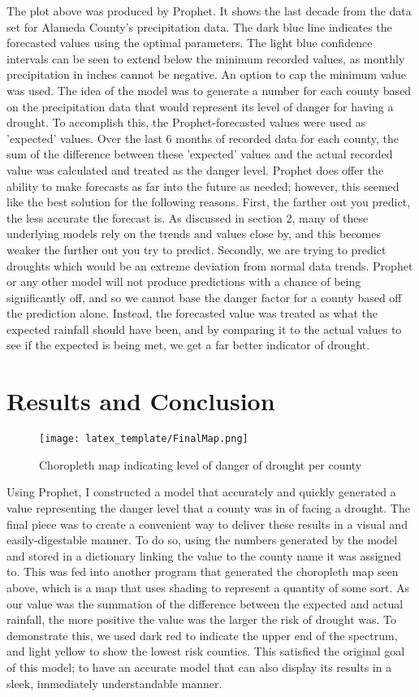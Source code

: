 \documentclass{article}
\begin{document}
The plot above was produced by Prophet. It shows the last decade from the data set for Alameda County's precipitation data. The dark blue line indicates the forecasted values using the optimal parameters. The light blue confidence intervals can be seen to extend below the minimum recorded values, as monthly precipitation in inches cannot be negative. An option to cap the minimum value was used. The idea of the model was to generate a number for each county based on the precipitation data that would represent its level of danger for having a drought. To accomplish this, the Prophet-forecasted values were used as 'expected' values. Over the last 6 months of recorded data for each county, the sum of the difference between these 'expected' values and the actual recorded value was calculated and treated as the danger level. Prophet does offer the ability to make forecasts as far into the future as needed; however, this seemed like the best solution for the following reasons. First, the farther out you predict, the less accurate the forecast is. As discussed in section 2, many of these underlying models rely on the trends and values close by, and this becomes weaker the further out you try to predict. Secondly, we are trying to predict droughts which would be an extreme deviation from normal data trends. Prophet or any other model will not produce predictions with a chance of being significantly off, and so we cannot base the danger factor for a county based off the prediction alone. Instead, the forecasted value was treated as what the expected rainfall should have been, and by comparing it to the actual values to see if the expected is being met, we get a far better indicator of drought. 


\section{Results and Conclusion}


\begin{figure}[htp]
    \centering
    \texttt{[image: latex\_template/FinalMap.png]}
    \caption{Choropleth map indicating level of danger of drought per county}
    \label{fig:galaxy}
\end{figure}


Using Prophet, I constructed a model that accurately and quickly generated a value representing the danger level that a county was in of facing a drought. The final piece was to create a convenient way to deliver these results in a visual and easily-digestable manner. To do so, using the numbers generated by the model and stored in a dictionary linking the value to the county name it was assigned to. This was fed into another program that generated the choropleth map seen above, which is a map that uses shading to represent a quantity of some sort. As our value was the summation of the difference between the expected and actual rainfall, the more positive the value was the larger the risk of drought was. To demonstrate this, we used dark red to indicate the upper end of the spectrum, and light yellow to show the lowest risk counties. This satisfied the original goal of this model; to have an accurate model that can also display its results in a sleek, immediately understandable manner. 
\end{document}
